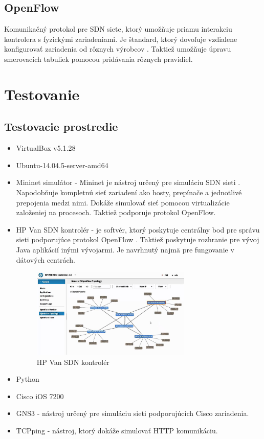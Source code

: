 \documentclass[conference]{IEEEtran}
\begin{document}
\subsection{OpenFlow}

Komunikačný protokol pre SDN siete, ktorý umožňuje priamu interakciu kontrolera s fyzickými zariadeniami. Je štandard, ktorý dovoľuje vzdialene konfigurovať zariadenia od rôznych výrobcov \cite{fourth}. Taktiež umožňuje úpravu smerovacích tabuliek pomocou pridávania rôznych pravidiel.

\section{Testovanie}

\subsection{Testovacie prostredie}

\begin{itemize}
\item{VirtualBox v5.1.28}
\item{Ubuntu-14.04.5-server-amd64}
\item{Mininet simulátor -}
Mininet je nástroj určený pre simuláciu SDN sieti \cite{fifth}. Napodobňuje kompletnú sieť zariadení ako hosty, prepínače a jednotlivé prepojenia medzi nimi. Dokáže simulovať sieť pomocou virtualizácie založeniej na procesoch. Taktiež podporuje protokol OpenFlow.
\item{HP Van SDN kontrolér -} je softvér, ktorý poskytuje centrálny bod pre správu sieti podporujúce protokol OpenFlow \cite{sixth}. Taktiež poskytuje rozhranie pre vývoj Java aplikácií inými vývojarmi. Je navrhnutý najmä pre fungovanie v dátových centrách.

\begin{figure}[h!]
\centering
\includegraphics[width=3in]{../img/HPVAN}
\caption{HP Van SDN kontrolér}
\end{figure}


\item{Python}
\item{Cisco iOS 7200}
\item{GNS3 -} nástroj určený pre simuláciu sieti podporujúcich Cisco zariadenia.
\item{TCPping -} nástroj, ktorý dokáže simulovať HTTP komunikáciu.
\end{itemize}
\end{document}
